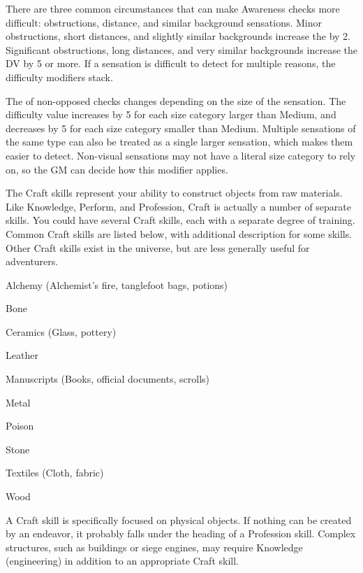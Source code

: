     There are three common circumstances that can make Awareness checks more difficult: obstructions, distance, and similar background sensations.
    Minor obstructions, short distances, and slightly similar backgrounds increase the  by 2.
    Significant obstructions, long distances, and very similar backgrounds increase the DV by 5 or more.
    If a sensation is difficult to detect for multiple reasons, the difficulty modifiers stack.

    The  of non-opposed checks changes depending on the size of the sensation.
    The difficulty value increases by 5 for each size category larger than Medium, and decreases by 5 for each size category smaller than Medium.
    Multiple sensations of the same type can also be treated as a single larger sensation, which makes them easier to detect.
    Non-visual sensations may not have a literal size category to rely on, so the GM can decide how this modifier applies.

\newpage
{}
  The Craft skills represent your ability to construct objects from raw materials.
  Like Knowledge, Perform, and Profession, Craft is actually a number of separate skills.
  You could have several Craft skills, each with a separate degree of training.
  Common Craft skills are listed below, with additional description for some skills.
  Other Craft skills exist in the universe, but are less generally useful for adventurers.

  \begin{raggeditemize}
    \item Alchemy (Alchemist's fire, tanglefoot bags, potions)
    \item Bone
    \item Ceramics (Glass, pottery)
    \item Leather
    \item Manuscripts (Books, official documents, scrolls)
    \item Metal
    \item Poison
    \item Stone
    \item Textiles (Cloth, fabric)
    \item Wood
  \end{raggeditemize}

  A Craft skill is specifically focused on physical objects. If nothing can be created by an endeavor, it probably falls under the heading of a Profession skill. Complex structures, such as buildings or siege engines, may require Knowledge (engineering) in addition to an appropriate Craft skill.

